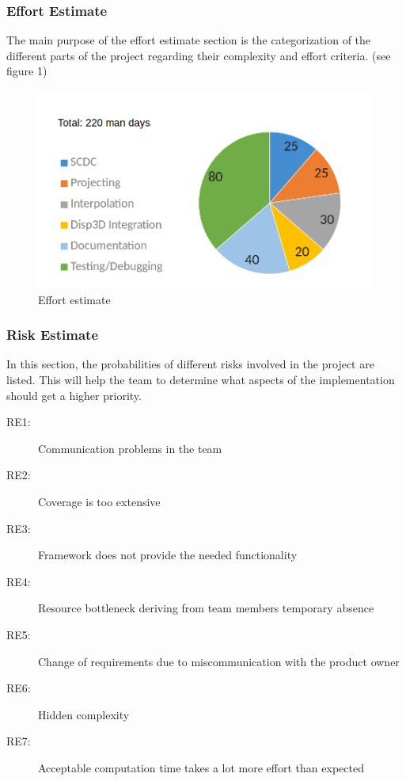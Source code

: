 \newpage

\subsubsection{Effort Estimate}
The main purpose of the effort estimate section is the categorization of the different parts of the project regarding their complexity and effort criteria.  
 (see figure 1)

\begin{figure}[h]
	\begin{center}
		\includegraphics[width= 14cm]{figures/aufwandsabschaetzung.png}
		\caption{Effort estimate}
	\end{center}
\end{figure}

\clearpage

\subsubsection{Risk Estimate}
In this section, the probabilities of different risks involved in the project are listed. This will help the team to determine what aspects of the implementation should get a higher priority.

\begin{description}
	\item[RE1:] Communication problems in the team
	\item[RE2:] Coverage is too extensive
	\item[RE3:] Framework does not provide the needed functionality 
	\item[RE4:] Resource bottleneck deriving from team members temporary absence 
	\item[RE5:] Change of requirements due to miscommunication with the product owner 
	\item[RE6:] Hidden complexity 
	\item[RE7:] Acceptable computation time takes a lot more effort than expected  
\end{description}

